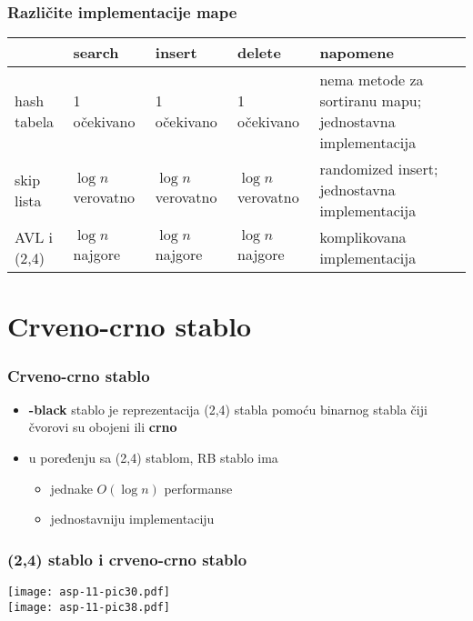\documentclass[compress,aspectratio=169]{beamer}
\begin{document}
\begin{frame}[fragile]
  \frametitle{Različite implementacije mape}
  \begin{tabular}{p{2cm}|p{1cm}|p{1cm}|p{1cm}|p{6cm}}
  & \textbf{search} & \textbf{insert} & \textbf{delete} & \textbf{napomene} \\ \hline\hline
  hash tabela & 1 \mbox{\tiny očekivano} & 1 \mbox{\tiny očekivano} & 1 \mbox{\tiny očekivano} & {\scriptsize nema metode za sortiranu mapu; jednostavna implementacija} \\ \hline
  skip lista & $\log n$ \mbox{\tiny verovatno} & $\log n$ \mbox{\tiny verovatno} & $\log n$ \mbox{\tiny verovatno} & {\scriptsize randomized insert; jednostavna implementacija} \\ \hline
  AVL i (2,4) & $\log n$ \mbox{\tiny najgore} & $\log n$ \mbox{\tiny najgore} & $\log n$ \mbox{\tiny najgore} & {\scriptsize komplikovana implementacija} \\ \hline
  \end{tabular}
\end{frame}

\section[RB stablo]{Crveno-crno stablo}

\begin{frame}[fragile]
  \frametitle{Crveno-crno stablo}
  \begin{itemize}
    \item \textbf{-black} stablo je reprezentacija (2,4) stabla pomoću binarnog stabla čiji čvorovi su obojeni \textbf{} ili \textbf{crno}
    \item u poređenju sa (2,4) stablom, RB stablo ima
    \begin{itemize}
      \item jednake $O(\log n)$ performanse
      \item jednostavniju implementaciju
    \end{itemize}
  \end{itemize}
\end{frame}

\begin{frame}[fragile]
  \frametitle{(2,4) stablo i crveno-crno stablo}
  \begin{center}
    \texttt{[image: asp-11-pic30.pdf]} \\
    \texttt{[image: asp-11-pic38.pdf]}
  \end{center}
\end{frame}
\end{document}
